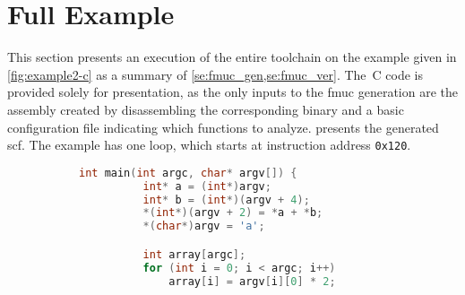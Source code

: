 \section{Full Example}\label{se:syntax_example}
This section presents an execution of the entire toolchain
on the example given in \cref{fig:example2-c}
as a summary of \cref{se:fmuc_gen,se:fmuc_ver}.
The~C code is provided solely for presentation,
as the only inputs to the \ac{fmuc} generation
are the assembly created by disassembling the corresponding binary%
%
%
and a basic configuration file indicating which functions to analyze.
 presents the generated \ac{scf}.
The example has one loop, which starts at instruction address \texttt{0x120}.%
\begin{figure}
  \begin{subfigure}[b]{.53\linewidth}
    \begin{lstlisting}[language=C, gobble=6]
      int main(int argc, char* argv[]) {
          int* a = (int*)argv;
          int* b = (int*)(argv + 4);
          *(int*)(argv + 2) = *a + *b;
          *(char*)argv = 'a';

          int array[argc];
          for (int i = 0; i < argc; i++)
              array[i] = argv[i][0] * 2;


\end{lstlisting}
\end{subfigure}
\end{figure}
